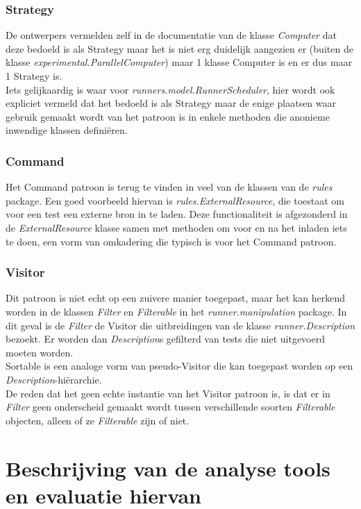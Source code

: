 \documentclass[i1]{oss}
\begin{document}
\subsubsection{Strategy}
De ontwerpers vermelden zelf in de documentatie van de klasse \emph{Computer} dat deze bedoeld is als Strategy maar het is niet erg duidelijk aangezien er (buiten de klasse \emph{experimental.ParallelComputer}) maar 1 klasse Computer is en er dus maar 1 Strategy is.
\\
Iets gelijkaardig is waar voor \emph{runners.model.RunnerScheduler}, hier wordt ook expliciet vermeld dat het bedoeld is als Strategy maar de enige plaatsen waar gebruik gemaakt wordt van het patroon is in enkele methoden die anonieme inwendige klassen defini\"eren.

\subsubsection{Command}
Het Command patroon is terug te vinden in veel van de klassen van de \emph{rules} package. 
Een goed voorbeeld hiervan is \emph{rules.ExternalResource}, die toestaat om voor een test een externe bron in te laden. 
Deze functionaliteit is afgezonderd in de \emph{ExternalResource} klasse samen met methoden om voor en na het inladen iets te doen, een vorm van omkadering die typisch is voor het Command patroon. 

\subsubsection{Visitor}
Dit patroon is niet echt op een zuivere manier toegepast, maar het kan herkend worden in de klassen \emph{Filter} en \emph{Filterable} in het \emph{runner.manipulation} package. 
In dit geval is de \emph{Filter} de Visitor die uitbreidingen van de klasse \emph{runner.Description} bezoekt. 
Er worden dan \emph{Description}s gefilterd van tests die niet uitgevoerd moeten worden. 
\\
Sortable is een analoge vorm van pseudo-Visitor die kan toegepast worden op een \emph{Description}-hi\"erarchie.
\\
De reden dat het geen echte instantie van het Visitor patroon is, is dat er in \emph{Filter} geen onderscheid gemaakt wordt tussen verschillende soorten \emph{Filterable} objecten, alleen of ze \emph{Filterable} zijn of niet.


\section{Beschrijving van de analyse tools en evaluatie hiervan}
\end{document}
